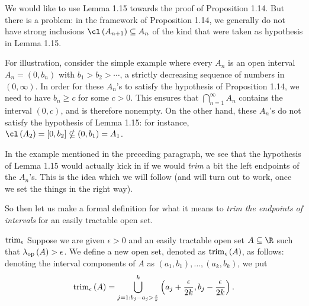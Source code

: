\documentclass[pmath450]{subfiles}
\begin{document}
    \np We would like to use Lemma 1.15 towards the proof of Proposition 1.14. But there is a problem: in the framework of Proposition 1.14, we generally do not have strong inclusions $\cl\left( A_{n+1} \right)\subseteq A_n$ of the kind that were taken as hypothesis in Lemma 1.15.

    For illustration, consider the simple example where every $A_n$ is an open interval $A_n=\left( 0,b_n \right)$ with $b_1>b_2>\cdots$, a strictly decreasing sequence of numbers in $\left( 0,\infty \right)$. In order for these $A_n$'s to satisfy the hypothesis of Proposition 1.14, we need to have $b_n\geq c$ for some $c>0$. This ensures that $\bigcap^{\infty}_{n=1}A_n$ contains the interval $\left( 0,c \right)$, and is therefore nonempty. On the other hand, these $A_n$'s do not satisfy the hypothesis of Lemma 1.15: for instance, $\cl\left( A_2 \right)=\left[ 0,b_2 \right]\nsubseteq\left( 0,b_1 \right)=A_1$.

    In the example mentioned in the preceding paragraph, we see that the hypothesis of Lemma 1.15 would actually kick in if we would \textit{trim} a bit the left endpoints of the $A_n$'s. This is the idea which we will follow (and will turn out to work, once we set the things in the right way).

    So then let us make a formal definition for what it means to \textit{trim the endpoints of intervals} for an easily tractable open set.

    \begin{notation}{$\operatorname{trim}_{\epsilon}$}
        Suppose we are given $\epsilon>0$ and an easily tractable open set $A\subseteq\R$ such that $\lambda_{\operatorname{op}}\left( A \right)>\epsilon$. We define a new open set, denoted as $\operatorname{trim}_{\epsilon}\left( A \right)$, as follows: denoting the interval components of $A$ as $\left( a_1,b_1 \right),\ldots,\left( a_k,b_k \right)$, we put
        \begin{equation}
            \operatorname{trim}_{\epsilon}\left( A \right) = \bigcup^{k}_{j=1: b_j-a_j>\frac{\epsilon}{k}} \left( a_j+\frac{\epsilon}{2k},b_j-\frac{\epsilon}{2k} \right).
        \end{equation}
    \end{notation}
\end{document}
